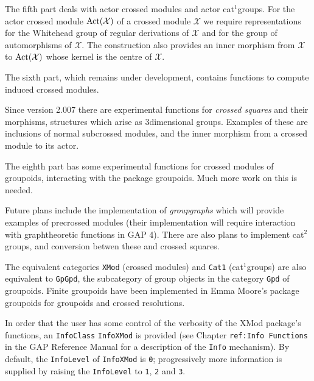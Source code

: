 \documentclass[a4paper,11pt]{report}
\newcommand{\calX}{\mathcal{X}}
\begin{document}
{ The fifth part deals with actor crossed modules and actor cat$^1$\texttt{}groups. For the actor crossed module ${\rm Act}(\calX)$ of a crossed module $\calX$ we require representations for the Whitehead group of regular derivations of $\calX$ and for the group of automorphisms of $\calX$. The construction also provides an inner morphism from $\calX$ to ${\rm Act}(\calX)$ whose kernel is the centre of $\calX$. 

 The sixth part, which remains under development, contains functions to compute
induced crossed modules. 

 Since version 2.007 there are experimental functions for \emph{crossed squares} and their morphisms, structures which arise as $3$\texttt{}dimensional groups. Examples of these are inclusions of
normal sub\texttt{}crossed modules, and the inner morphism from a
crossed module to its actor. 

 The eighth part has some experimental functions for crossed modules of
groupoids, interacting with the package \textsf{groupoids}. Much more work on this is needed. 

 Future plans include the implementation of \emph{group\texttt{}graphs} which will provide examples of pre\texttt{}crossed modules (their
implementation will require interaction with
graph\texttt{}theoretic functions in \textsf{GAP} 4). There are also plans to implement cat$^2$\texttt{}groups, and conversion betwen these and crossed squares. 

 The equivalent categories \texttt{XMod} (crossed modules) and \texttt{Cat1} (cat$^1$\texttt{}groups) are also equivalent to \texttt{GpGpd}, the subcategory of group objects in the category \texttt{Gpd} of groupoids. Finite groupoids have been implemented in Emma Moore's package \textsf{groupoids} \cite{M1} for groupoids and crossed resolutions. 

  In order that the user has some control of the verbosity of the \textsf{XMod} package's functions, an \texttt{InfoClass} \texttt{InfoXMod} is provided (see Chapter \texttt{ref:Info Functions} in the \textsf{GAP} Reference Manual for a description of the \texttt{Info} mechanism). By default, the \texttt{InfoLevel} of \texttt{InfoXMod} is \texttt{0}; progressively more information is supplied by raising the \texttt{InfoLevel} to \texttt{1}, \texttt{2} and \texttt{3}. 

 
\begin{Verbatim}[commandchars=!@|,fontsize=\small,frame=single,label=Example]
  

\end{Verbatim}}
\end{document}

